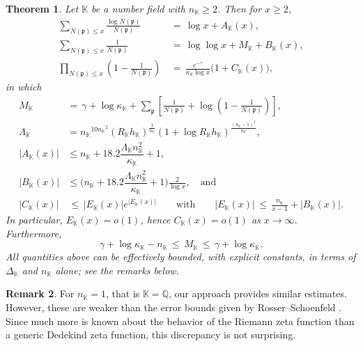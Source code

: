 \documentclass[10pt,reqno]{amsart}
\theoremstyle{plain}
\newtheorem{theorem}{Theorem}
\theoremstyle{definition}
\newtheorem{remark}[theorem]{Remark}
\newcommand{\Q}{\mathbb{Q}}
\newcommand{\K}{\mathbb{K}}
\newcommand{\PP}{\mathfrak{p}}
\begin{document}
\begin{theorem}\label{Theorem:Main}
Let $\K$ be a number field with $n_{\K} \geq 2$.  Then for $x \geq 2$,
\begin{align}
    \sum_{N(\PP)\leq x}\frac{\log{N(\PP)}}{N(\PP)} &\,=\, \log{x} + A_{\K}(x) ,\label{eq:A1}\tag{A1}\\[5pt]
    \sum_{N(\PP)\leq x}\frac{1}{N(\PP)} &\,=\, \log\log{x} + M_{\K} + B_{\K}(x),\label{eq:B1} \tag{B1}\\[5pt]
    \prod_{N(\PP)\leq x}\left(1 - \frac{1}{N(\PP)}\right) &\,=\, \frac{e^{-\gamma}}{\kappa_{\K}\log{x}} \big(1 + C_{\K}(x) \big),\label{eq:C1}\tag{C1}
\end{align}
in which
\begin{align}
M_{\K} \,&=\, \gamma + \log{\kappa_{\K}} + \sum_{\PP}\left[\frac{1}{N(\PP)} + \log\left(1 - \frac{1}{N(\PP)}\right)\right]\label{eq:M1}\tag{M1},\\
\Lambda_{\K} &= {n_{\K}}^{10 {n_{\K}}^2}(R_{\K}h_{\K})^{\frac{1}{n_{\K}}}(1 + \log{R_{\K} h_{\K}})^{\frac{(n_{\K}-1)^2}{n_{\K}}}, \label{eq:Lambda} \tag{$\Lambda$}\\
|A_{\K}(x)| 
&\leq n_{\K}  + 18.2 \dfrac{\Lambda_{\K}n_{\K}^2}{\kappa_{\K}} + 1,
\label{eq:A2}\tag{A2}\\[5pt]
|B_{\K}(x)| &\leq 
\bigg(n_{\K}  + 18.2 \dfrac{\Lambda_{\K}n_{\K}^2}{\kappa_{\K}} + 1 \bigg) \frac{2}{\log x},
\quad\text{and}\label{eq:B2}\tag{B2}\\[5pt]
|C_{\K}(x)| &\,\leq\, |E_{\K}(x)|e^{| E_{\K}(x)|} \qquad \text{with}\qquad |E_{\K}(x)| \,\leq\, \frac{n_{\K}}{x-1} + |B_{\K}(x)|.\label{eq:C2}\tag{C2}
\end{align}
In particular, $E_{\K}(x) = o(1)$, hence $C_{\K}(x) = o(1)$ as $x \to \infty$.  Furthermore,
\begin{equation}\label{eq:M2}\tag{M2}
    \gamma + \log \kappa_{\K} -n_{\K} \,\leq\, M_{\K} \,\leq\,  \gamma + \log \kappa_{\K}.
\end{equation}
All quantities above can be effectively bounded, with explicit constants, in terms of $\Delta_{\K}$ and $n_{\K}$ alone;
see the remarks below.
\end{theorem}

\begin{remark}
For $n_{\K} = 1$, that is $\K = \Q$, our approach provides similar estimates.  However,
these are weaker than the error bounds given by Rosser--Schoenfeld \cite[Thms.~5-7]{Rosser}.
Since much more is known about the behavior of the Riemann zeta function than
a generic Dedekind zeta function, this discrepancy is not surprising.
\end{remark}
\end{document}
